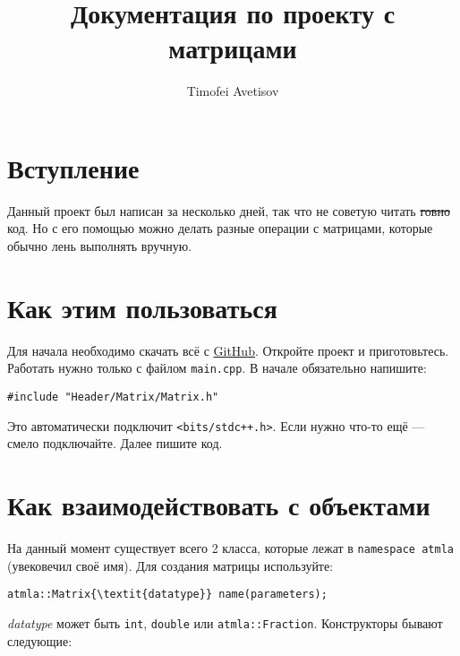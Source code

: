 \documentclass{article}
\title{Документация по проекту с матрицами}
\author{Timofei Avetisov}
\date{}
\begin{document}
\maketitle

\section{Вступление}
Данный проект был написан за несколько дней, так что не советую читать \st{говно} код. Но с его помощью можно делать разные операции с матрицами, которые обычно лень выполнять вручную.

\section{Как этим пользоваться}
Для начала необходимо скачать всё с \href{https://github.com/TimofeiAvetisov/atmla.git}{GitHub}. Откройте проект и приготовьтесь. Работать нужно только с файлом \texttt{main.cpp}. В начале обязательно напишите:
\begin{verbatim}
#include "Header/Matrix/Matrix.h"
\end{verbatim}
Это автоматически подключит \texttt{<bits/stdc++.h>}. Если нужно что-то ещё — смело подключайте. Далее пишите код.

\section{Как взаимодействовать с объектами}
На данный момент существует всего 2 класса, которые лежат в \texttt{namespace atmla} (увековечил своё имя). Для создания матрицы используйте:
\begin{verbatim}
atmla::Matrix{\textit{datatype}} name(parameters);
\end{verbatim}
\textit{datatype} может быть \texttt{int}, \texttt{double} или \texttt{atmla::Fraction}. Конструкторы бывают следующие:
\end{document}
